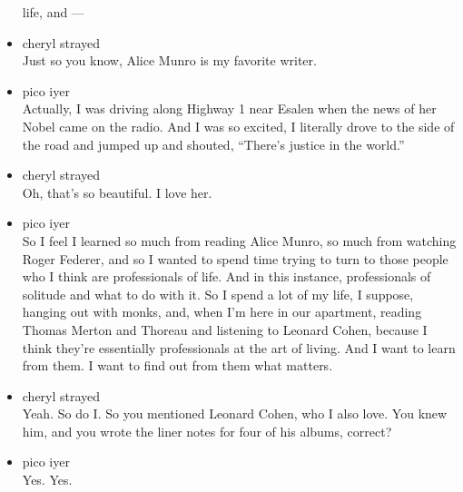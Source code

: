 \begin{itemize}
  life, and ---
\item
  cheryl strayed\\
  Just so you know, Alice Munro is my favorite writer.
\item
  pico iyer\\
  Actually, I was driving along Highway 1 near Esalen when the news of
  her Nobel came on the radio. And I was so excited, I literally drove
  to the side of the road and jumped up and shouted, ``There's justice
  in the world.''
\item
  cheryl strayed\\
  Oh, that's so beautiful. I love her.
\item
  pico iyer\\
  So I feel I learned so much from reading Alice Munro, so much from
  watching Roger Federer, and so I wanted to spend time trying to turn
  to those people who I think are professionals of life. And in this
  instance, professionals of solitude and what to do with it. So I spend
  a lot of my life, I suppose, hanging out with monks, and, when I'm
  here in our apartment, reading Thomas Merton and Thoreau and listening
  to Leonard Cohen, because I think they're essentially professionals at
  the art of living. And I want to learn from them. I want to find out
  from them what matters.
\item
  cheryl strayed\\
  Yeah. So do I. So you mentioned Leonard Cohen, who I also love. You
  knew him, and you wrote the liner notes for four of his albums,
  correct?
\item
  pico iyer\\
  Yes. Yes.


\end{itemize}
